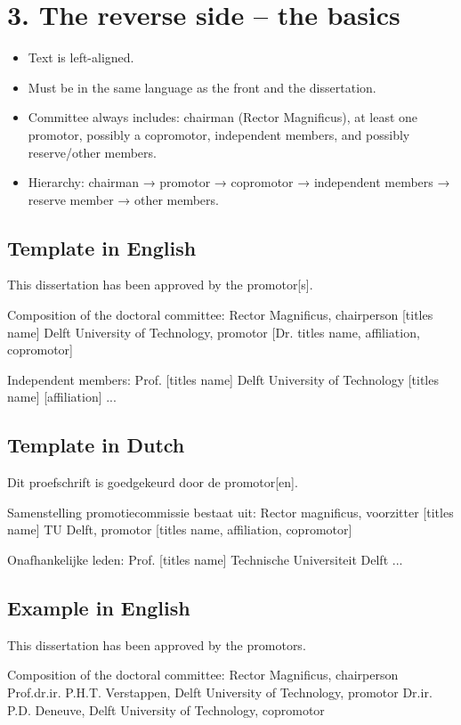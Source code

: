 \section*{3. The reverse side – the basics}
\begin{itemize}
\item Text is left-aligned.  
\item Must be in the same language as the front and the dissertation.  
\item Committee always includes: chairman (Rector Magnificus), at least one promotor, possibly a copromotor, independent members, and possibly reserve/other members.  
\item Hierarchy: chairman → promotor → copromotor → independent members → reserve member → other members.  
\end{itemize}

\subsection*{Template in English}
This dissertation has been approved by the promotor[s].  

Composition of the doctoral committee:  
Rector Magnificus, chairperson  
[titles name] Delft University of Technology, promotor  
[Dr. titles name, affiliation, copromotor]  

Independent members:  
Prof. [titles name] Delft University of Technology  
[titles name] [affiliation]  
...

\subsection*{Template in Dutch}
Dit proefschrift is goedgekeurd door de promotor[en].  

Samenstelling promotiecommissie bestaat uit:  
Rector magnificus, voorzitter  
[titles name] TU Delft, promotor  
[titles name, affiliation, copromotor]  

Onafhankelijke leden:  
Prof. [titles name] Technische Universiteit Delft  
...

\subsection*{Example in English}
This dissertation has been approved by the promotors.  

Composition of the doctoral committee:  
Rector Magnificus, chairperson  
Prof.dr.ir. P.H.T. Verstappen, Delft University of Technology, promotor  
Dr.ir. P.D. Deneuve, Delft University of Technology, copromotor  

